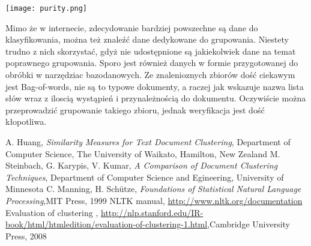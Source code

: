 \documentclass{article}
\begin{document}
\begin{center}
\texttt{[image: purity.png]}
\end{center}

Mimo że w internecie, zdecydowanie bardziej powszechne są dane do klasyfikowania, można też znaleźć dane dedykowane do grupowania. Niestety trudno z nich skorzystać, gdyż nie udostępnione są jakiekolwiek dane na temat poprawnego grupowania. Sporo jest również danych w formie przygotowanej do obróbki w narzędziac bazodanowych. 
Ze znalenioznych zbiorów dość ciekawym jest Bag-of-words, nie są to typowe dokumenty, a raczej jak wskazuje nazwa lista słów wraz z iloscią wystąpień i przynależnością do dokumentu. Oczywiście można przeprowadzić grupowanie takiego zbioru, jednak weryfikacja jest dość kłopotliwa.

\begin{thebibliography}{9}
A. Huang, \emph{Similarity Measures for Text Document Clustering}, Department of Computer Science, The University of Waikato, Hamilton, New Zealand
M. Steinbach, G. Karypis, V. Kumar, \emph{A Comparison of Document Clustering Techniques}, Department of Computer Science and Egineering, University of Minnesota
C. Manning, H. Schütze, \emph{Foundations of Statistical Natural Language Processing},MIT Press, 1999
NLTK manual, \url{http://www.nltk.org/documentation}
Evaluation of clustering , \url{http://nlp.stanford.edu/IR-book/html/htmledition/evaluation-of-clustering-1.html},Cambridge University Press, 2008
\end{thebibliography}
\end{document}
